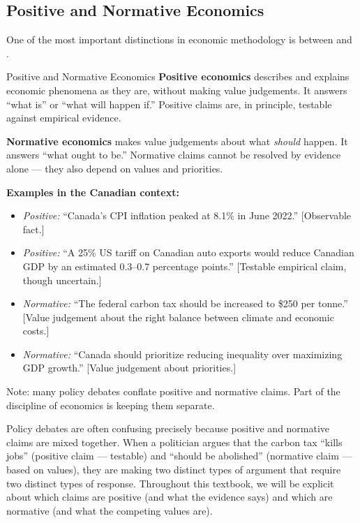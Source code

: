 \subsection{Positive and Normative Economics}

One of the most important distinctions in economic methodology is between
 and .

\begin{defbox}{Positive and Normative Economics}
\textbf{Positive economics} describes and explains economic phenomena
as they are, without making value judgements. It answers ``what is''
or ``what will happen if.'' Positive claims are, in principle, testable
against empirical evidence.

\textbf{Normative economics} makes value judgements about what
\textit{should} happen. It answers ``what ought to be.'' Normative
claims cannot be resolved by evidence alone --- they also depend on
values and priorities.

\textbf{Examples in the Canadian context:}
\begin{itemize}
  \item \textit{Positive:} ``Canada's CPI inflation peaked at 8.1\% in
        June 2022.'' [Observable fact.]
  \item \textit{Positive:} ``A 25\% US tariff on Canadian auto exports
        would reduce Canadian GDP by an estimated 0.3--0.7 percentage
        points.'' [Testable empirical claim, though uncertain.]
  \item \textit{Normative:} ``The federal carbon tax should be increased
        to \$250 per tonne.'' [Value judgement about the right balance
        between climate and economic costs.]
  \item \textit{Normative:} ``Canada should prioritize reducing inequality
        over maximizing GDP growth.'' [Value judgement about priorities.]
\end{itemize}

Note: many policy debates conflate positive and normative claims. Part
of the discipline of economics is keeping them separate.
\end{defbox}

Policy debates are often confusing precisely because positive and normative
claims are mixed together. When a politician argues that the carbon tax
``kills jobs'' (positive claim --- testable) and ``should be abolished''
(normative claim --- based on values), they are making two distinct types
of argument that require two distinct types of response. Throughout this
textbook, we will be explicit about which claims are positive (and what
the evidence says) and which are normative (and what the competing values are).

